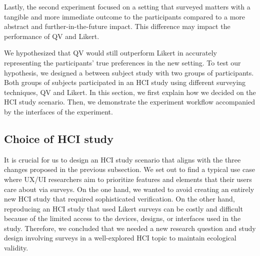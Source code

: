 Lastly, the second experiment focused on a setting that surveyed matters with a tangible and more immediate outcome to the participants compared to a more abstract and further-in-the-future impact. This difference  may impact the performance of QV and Likert.

We hypothesized that QV would still outperform Likert in accurately representing the participants' true preferences in the new setting. To test our hypothesis, we designed a between subject study with two groups of participants. Both groups of subjects participated in an HCI study using different surveying techniques, QV and Likert. In this section, we first explain how we decided on the HCI study scenario. Then, we demonstrate the experiment workflow accompanied by the interfaces of the experiment.

 
\subsection{Choice of HCI study}
It is crucial for us to design an HCI study scenario that aligns with the three changes proposed in the previous subsection. We set out to find a typical use case where UX/UI researchers aim to prioritize features and elements that their users care about via surveys. On the one hand, we wanted to avoid creating an entirely new HCI study that required sophisticated verification. On the other hand, reproducing an HCI study that used Likert surveys can be costly and difficult because of the limited access to the devices, designs, or interfaces used in the study. Therefore, we concluded that we needed a new research question and study design involving surveys in a well-explored HCI topic to maintain ecological validity.

